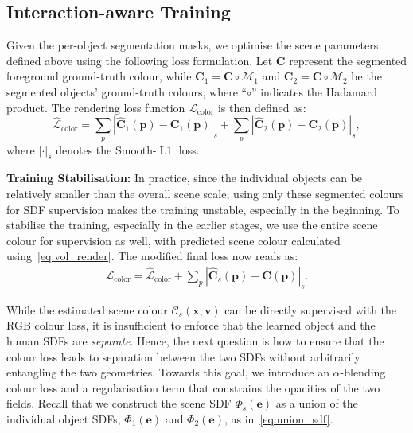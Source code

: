 \subsection{Interaction-aware Training} 
\label{sec:losses}
Given the per-object segmentation masks, we optimise the scene parameters defined above using the following loss formulation. 
Let $\mathbf{C}$ represent the segmented foreground ground-truth colour, while 
$\mathbf{C}_1 = \mathbf{C} \circ \mathcal{M}_1$ and $\mathbf{C}_2 = \mathbf{C} \circ \mathcal{M}_2$ be the segmented objects' ground-truth colours, where ``$\circ$'' indicates the Hadamard product. 
The rendering loss function $\mathcal{L}_{\text{color}}$ is then defined as: 
\begin{equation} \label{eq:partial_color_loss}
    \mathcal{\hat{L}}_{\text{color}} = \sum_p|\mathbf{\hat{C}}_1(\mathbf{p}) - \mathbf{C}_1(\mathbf{p})|_s + \sum_p |\mathbf{\hat{C}}_2(\mathbf{p}) - \mathbf{C}_2(\mathbf{p})|_s, 
\end{equation}
where $|\cdot|_s$ denotes the  Smooth-$\operatorname{L1}$ loss. 
\par
\noindent \textbf{Training Stabilisation:}
In practice, since the individual objects can be relatively smaller than the overall scene scale, using only these segmented colours for SDF supervision makes the training unstable, especially in the beginning.
To stabilise the training, especially in the earlier stages, we use the entire scene colour for supervision as well, with predicted scene colour calculated using~\cref{eq:vol_render}.
The modified final loss now reads as:
\begin{align} 
    \mathcal{L}_{\text{color}} = \hat{\mathcal{L}}_{\text{color}} + \sum_p |\mathbf{\hat{C}}_s(\mathbf{p}) - \mathbf{C}(\mathbf{p})|_s. 
    \label{eq:color_loss} 
\end{align} 
\par 
While the estimated scene colour $\mathcal{C}_s(\mathbf{x}, \mathbf{v})$ can be directly supervised with the RGB colour loss, it is insufficient to enforce that the learned object and the human SDFs are \textit{separate}. 
Hence, the next question is how to ensure that the colour loss leads to separation between the two SDFs without arbitrarily entangling the two geometries.
Towards this goal, we introduce an $\alpha$-blending colour loss and a regularisation term that constrains the opacities of the two fields. 
Recall that we construct the scene SDF $\Phi_{s}(\mathbf{e})$ as a union of the individual object SDFs, $\Phi_1(\mathbf{e})$ and $\Phi_2(\mathbf{e})$, as in~\cref{eq:union_sdf}. 
